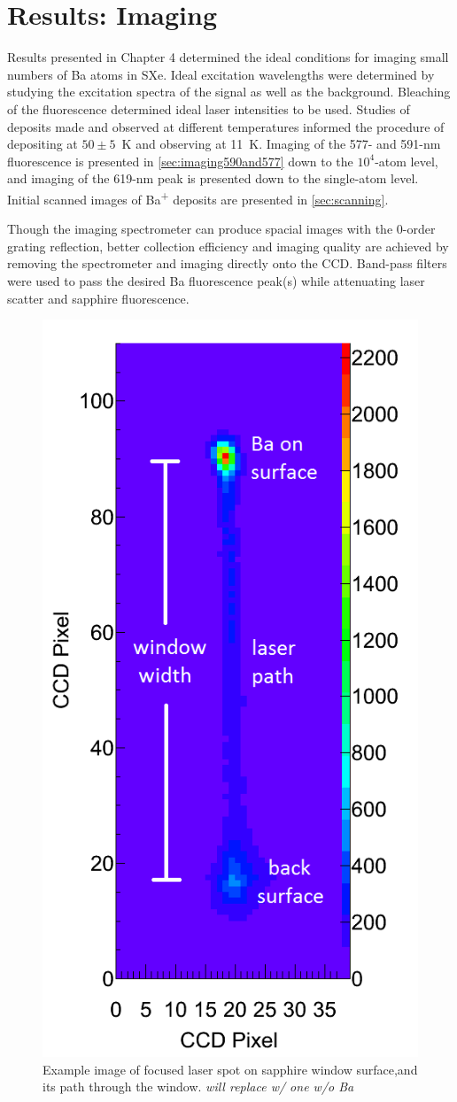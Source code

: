 \chapter{Results: Imaging}
\label{imaging}

Results presented in Chapter 4 determined the ideal conditions for imaging small numbers of Ba atoms in SXe.  Ideal excitation wavelengths were determined by studying the excitation spectra of the signal as well as the background.  Bleaching of the fluorescence determined ideal laser intensities to be used.  Studies of deposits made and observed at different temperatures informed the procedure of depositing at $50 \pm 5$~K and observing at 11~K.  Imaging of the 577- and 591-nm fluorescence is presented in \ref{sec:imaging590and577} down to the $10^{4}$-atom level, and imaging of the 619-nm peak is presented down to the single-atom level.  Initial scanned images of Ba\textsuperscript{+} deposits are presented in \ref{sec:scanning}.

Though the imaging spectrometer can produce spacial images with the 0-order grating reflection, better collection efficiency and imaging quality are achieved by removing the spectrometer and imaging directly onto the CCD.  Band-pass filters were used to pass the desired Ba fluorescence peak(s) while attenuating laser scatter and sapphire fluorescence.

\begin{figure} %
        \centering
                \includegraphics[width=.4\textwidth]{figures/raw_14-atom_labels_from_paper_1f.png}
                \caption{Example image of focused laser spot on sapphire window surface,and its path through the window.  \emph{\color{red}will replace w/ one w/o Ba}}
\label{fig:imageexamp}
\end{figure}


